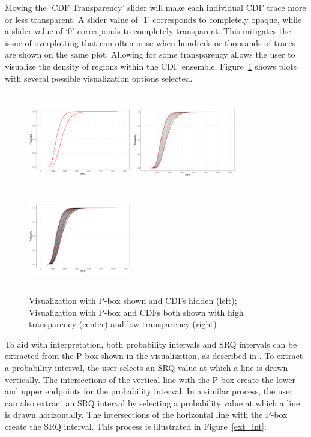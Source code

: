 \documentclass[11pt]{asaproc}\usepackage[]{graphicx}\usepackage[]{color}
\begin{document}
Moving the `CDF Transparency' slider will make each individual CDF trace more or less transparent. A slider value of `1' corresponds to completely opaque, while a slider value of `0' corresponds to completely transparent. This mitigates the issue of overplotting that can often arise when hundreds or thousands of traces are shown on the same plot. Allowing for some transparency allows the user to visualize the density of regions within the CDF ensemble. Figure~\ref{viz_opt} shows plots with several possible visualization options selected. 

\begin{figure}[t]
\begin{center} 
\includegraphics[height=4.2cm,width=4.5cm]{figures2/pbx_only.png}
\includegraphics[height=4.1cm,width=4.5cm]{figures2/pbx_cdf_d.png}
\includegraphics[height=4.1cm,width=4.5cm]{figures2/pbx_cdf_l.png} 
\end{center} 
\caption{\label{viz_opt}Visualization with P-box shown and CDFs hidden (left); Visualization with P-box and CDFs both shown with high transparency (center) and low transparency (right)}
\end{figure}

To aid with interpretation, both probability intervals and SRQ intervals can be extracted from the P-box shown in the visualization, as described in \cite{EW2018}. To extract a probability interval, the user selects an SRQ value at which a line is drawn vertically. The intersections of the vertical line with the P-box create the lower and upper endpoints for the probability interval. In a similar process, the user can also extract an SRQ interval by selecting a probability value at which a line is drawn horizontally. The intersections of the horizontal line with the P-box create the SRQ interval. This process is illustrated in Figure~\ref{ext_int}. 
\end{document}
